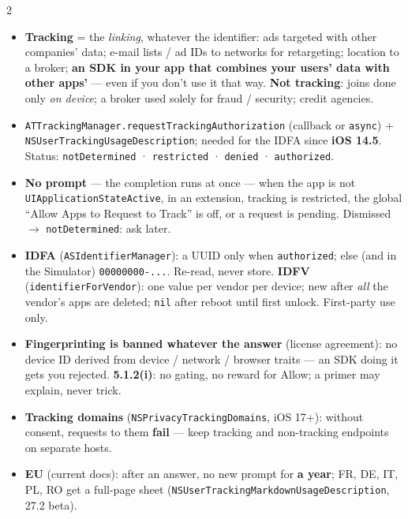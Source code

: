 \documentclass[8pt]{extarticle}
\newcommand\ct[1]{\texttt{#1}}
\newcommand\hd[1]{\par\vspace{3pt}\noindent{\bfseries\color{sheetBlue}#1}\par\vspace{1pt}}
\begin{document}
\begin{multicols}{2}
\raggedright{}

\hd{ATT}
\begin{itemize}
  \item \textbf{Tracking} = the \emph{linking}, whatever the identifier: ads targeted with other companies' data;
        e-mail lists / ad IDs to networks for retargeting; location to a broker; \textbf{an SDK in your app that
        combines your users' data with other apps'} — even if you don't use it that way. \textbf{Not
        tracking}: joins done only \emph{on device}; a broker used solely for fraud / security; credit agencies.
  \item \ct{ATTrackingManager.requestTrackingAuthorization} (callback or \ct{async}) +
        \ct{NSUserTrackingUsageDescription}; needed for the IDFA since \textbf{iOS 14.5}. Status:
        \ct{notDetermined} · \ct{restricted} · \ct{denied} · \ct{authorized}.
  \item \textbf{No prompt} — the completion runs at once — when the app is not
        \ct{UIApplicationStateActive}, in an extension, tracking is restricted, the global ``Allow Apps to
        Request to Track'' is off, or a request is pending. Dismissed $\to$ \ct{notDetermined}: ask later.
  \item \textbf{IDFA} (\ct{ASIdentifierManager}): a UUID only when \ct{authorized}; else (and in the
        Simulator) \ct{00000000-...}. Re-read, never store. \textbf{IDFV} (\ct{identifierForVendor}): one
        value per vendor per device; new after \emph{all} the vendor's apps are deleted; \ct{nil} after reboot
        until first unlock. First-party use only.
  \item \textbf{Fingerprinting is banned whatever the answer} (license agreement): no device ID derived from
        device / network / browser traits — an SDK doing it gets you rejected. \textbf{5.1.2(i)}: no gating,
        no reward for Allow; a primer may explain, never trick.
  \item \textbf{Tracking domains} (\ct{NSPrivacyTrackingDomains}, iOS 17+): without consent, requests to
        them \textbf{fail} — keep tracking and non-tracking endpoints on separate hosts.
  \item \textbf{EU} (current docs): after an answer, no new prompt for \textbf{a year}; FR, DE, IT, PL, RO get a
        full-page sheet (\ct{NSUserTrackingMarkdownUsageDescription}, 27.2 beta).
\end{itemize}


\end{multicols}
\end{document}
